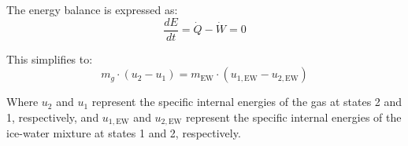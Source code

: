 The energy balance is expressed as:  
\[
\frac{dE}{dt} = \dot{Q} - \dot{W} = 0
\]  

This simplifies to:  
\[
m_g \cdot (u_2 - u_1) = m_{\text{EW}} \cdot (u_{1,\text{EW}} - u_{2,\text{EW}})
\]  

Where \( u_2 \) and \( u_1 \) represent the specific internal energies of the gas at states 2 and 1, respectively, and \( u_{1,\text{EW}} \) and \( u_{2,\text{EW}} \) represent the specific internal energies of the ice-water mixture at states 1 and 2, respectively.